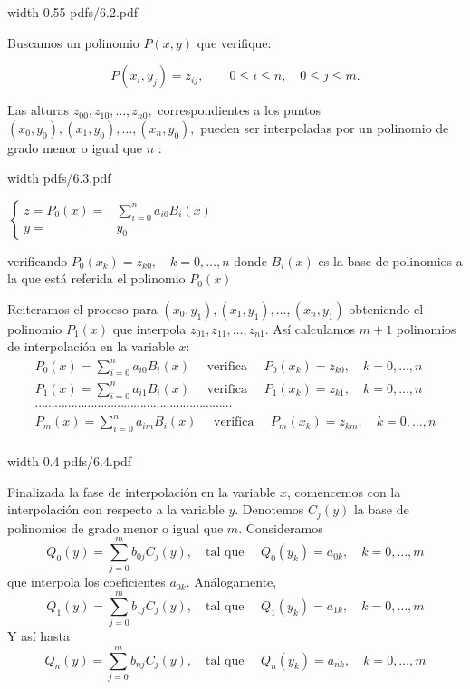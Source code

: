 \documentclass[twoside]{report}
\newcommand{\colocapdf}[2]{\quad\pdfimage width #2 {pdfs/#1.pdf}}
\begin{document}
\begin{center}
\colocapdf{6.2}{0.55\textwidth}
\end{center}

Buscamos un polinomio $P(x,y)$ que verifique:

$$P(x_i,y_j)=z_{ij},\quad \quad 0\leq i\leq n,\quad 0\leq j\leq
m.$$

Las alturas $z_{00},z_{10},\ldots,z_{n0},$ correspondientes a los puntos $(x_0,y_0),(x_1,y_0),\ldots,(x_n,y_0),$ pueden ser interpoladas por un polinomio de grado menor o igual que $n$ :

\begin{minipage}{.35\textwidth}\colocapdf{6.3}{\textwidth}
\end{minipage} \quad \quad \quad
\begin{minipage}{.4\textwidth} $\left\{ \begin{array}{rl}
z=P_0(x)=&\sum_{i=0}^n a_{i0} B_i(x)\\
y=&y_0 \end{array} \right.$
\end{minipage}

verificando $P_0(x_k)=z_{k0}, \quad k=0,\ldots,n$ donde $B_i(x)$ es la base de polinomios a la que está referida el polinomio $P_0(x)$

Reiteramos el proceso para $(x_0,y_1),(x_1,y_1),\ldots,(x_n,y_1)$ obteniendo el polinomio $P_1(x)$ que interpola $z_{01},z_{11},\ldots,z_{n1}.$ Así calculamos $m+1$ polinomios de interpolación en la variable $x$:
$$\begin{array}{c}
P_0(x)=\sum_{i=0}^n a_{i0} B_i(x) \quad \mbox{ verifica } \quad
P_0(x_k)=z_{k0}, \quad k=0,\ldots,n \\
P_1(x)=\sum_{i=0}^n a_{i1} B_i(x) \quad \mbox{ verifica } \quad
P_1(x_k)=z_{k1}, \quad k=0,\ldots,n \\
\cdots \cdots \cdots \cdots \cdots \cdots \cdots \cdots \cdots \cdots \cdots \cdots \cdots \cdots \cdots \cdots \cdots \cdots \cdots \cdots\\
P_m(x)=\sum_{i=0}^n a_{im} B_i(x) \quad \mbox{ verifica } \quad
P_m(x_k)=z_{km}, \quad k=0,\ldots,n \\
\end{array}$$
\begin{center}
\colocapdf{6.4}{0.4\textwidth}
\end{center}

Finalizada la fase de interpolación en la variable $x$, comencemos con la interpolación con respecto a la variable $y$. Denotemos $C_j(y)$ la base de polinomios de grado menor o igual que $m$. Consideramos
$$Q_0(y)=\sum_{j=0}^m b_{0j}C_j(y),\quad  \mbox{tal que }\quad Q_0(y_k)=a_{0k},\quad k=0,\ldots,m$$
que interpola los coeficientes $a_{0k}$. Análogamente,
$$Q_1(y)=\sum_{j=0}^m b_{1j}C_j(y),\quad \mbox{tal que }\quad Q_1(y_k)=a_{1k},\quad k=0,\ldots,m$$
Y así hasta
$$Q_n(y)=\sum_{j=0}^m b_{nj}C_j(y),\quad \mbox{tal que }\quad
    Q_n(y_k)=a_{nk},\quad k=0,\ldots,m$$
\end{document}
